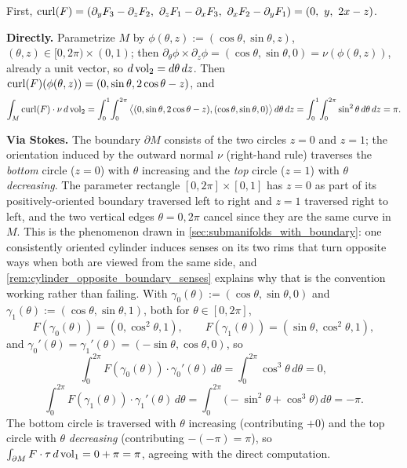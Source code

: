 \begin{exercisesolution}
First, $\operatorname{curl}(F) = (\partial_yF_3-\partial_zF_2,\ \partial_zF_1-\partial_xF_3,\
\partial_xF_2-\partial_yF_1) = (0,\ y,\ 2x-z)$.

\textbf{Directly.} Parametrize $M$ by $\phi(\theta,z) := (\cos\theta,\sin\theta,z)$,
$(\theta,z)\in[0,2\pi)\times(0,1)$; then
$\partial_\theta\phi\times\partial_z\phi = (\cos\theta,\sin\theta,0) = \nu(\phi(\theta,z))$,
already a unit vector, so $d\operatorname{vol}_2 = d\theta\,dz$. Then
$\operatorname{curl}(F)(\phi(\theta,z)) = (0,\sin\theta,2\cos\theta-z)$, and
\[\int_M\operatorname{curl}(F)\cdot\nu\,d\operatorname{vol}_2 = \int_0^1\!\int_0^{2\pi}
  \big\langle(0,\sin\theta,2\cos\theta-z),(\cos\theta,\sin\theta,0)\big\rangle\,d\theta\,dz
  = \int_0^1\!\int_0^{2\pi}\sin^2\theta\,d\theta\,dz = \pi.\]

\textbf{Via Stokes.} The boundary $\partial M$ consists of the two circles $z=0$ and $z=1$; the
orientation induced by the outward normal $\nu$ (right-hand rule) traverses the \emph{bottom}
circle ($z=0$) with $\theta$ increasing and the \emph{top} circle ($z=1$) with $\theta$
\emph{decreasing}. The parameter rectangle $[0,2\pi]\times[0,1]$ has $z=0$ as part of its
positively-oriented boundary traversed left to right and $z=1$ traversed right to left, and the
two vertical edges $\theta=0,2\pi$ cancel since they are the same curve in $M$. This is the
phenomenon drawn in \cref{sec:submanifolds_with_boundary}: one consistently oriented cylinder
induces senses on its two rims that turn opposite ways when both are viewed from the same side,
and \cref{rem:cylinder_opposite_boundary_senses} explains why that is the convention working
rather than failing. With
$\gamma_0(\theta):=(\cos\theta,\sin\theta,0)$ and $\gamma_1(\theta):=(\cos\theta,\sin\theta,1)$,
both for $\theta\in[0,2\pi]$,
\[F(\gamma_0(\theta)) = (0,\cos^2\theta,1), \qquad F(\gamma_1(\theta)) = (\sin\theta,\cos^2\theta,1),\]
and $\gamma_0'(\theta)=\gamma_1'(\theta)=(-\sin\theta,\cos\theta,0)$, so
\[\int_0^{2\pi} F(\gamma_0(\theta))\cdot\gamma_0'(\theta)\,d\theta = \int_0^{2\pi}\cos^3\theta\,d\theta = 0,\]
\[\int_0^{2\pi} F(\gamma_1(\theta))\cdot\gamma_1'(\theta)\,d\theta
  = \int_0^{2\pi}\big({-}\sin^2\theta+\cos^3\theta\big)\,d\theta = -\pi.\]
The bottom circle is traversed with $\theta$ increasing (contributing $+0$) and the top circle
with $\theta$ \emph{decreasing} (contributing $-({-}\pi) = \pi$), so
$\int_{\partial M}F\cdot\tau\,d\operatorname{vol}_1 = 0+\pi = \pi$, agreeing with the direct computation.
\end{exercisesolution}

